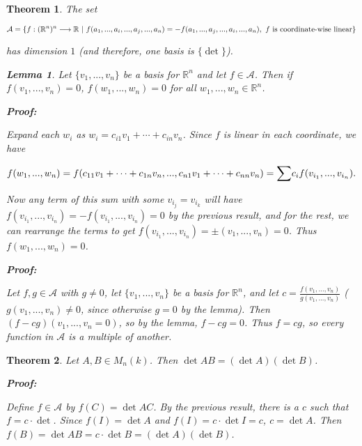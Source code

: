 \documentclass{article}
\theoremstyle{colontheorem}
\newtheorem{theorem}{Theorem}[section]
\newtheorem{lemma}{Lemma}[theorem]
\newenvironment{Theorem}
{
	\begin{mdframed}[backgroundcolor=TheoremOrange!10]
	\begin{theorem}
}
{
	\end{theorem}
	\end{mdframed}
	
	\vspace{.15in}
}
\newenvironment{Lemma}
{
	\begin{mdframed}[backgroundcolor=LemmaYellow!10]
	\begin{lemma}
}
{
	\end{lemma}
	\end{mdframed}
	
	\vspace{.03in}
}
\newenvironment{Proof}
{
	\begin{mdframed}[backgroundcolor=ProofPurple!10]
	\textbf{Proof:}%
}
{
	\end{mdframed}
	
	\vspace{.085in}
}
\begin{document}
\begin{Theorem}
	
	The set
	
	$$\mathcal{A} = \{f : (\mathbb{R}^n)^n \longrightarrow \mathbb{R}\ |\ f(a_1, ..., a_i, ..., a_j, ..., a_n) = -f(a_1, ..., a_j, ..., a_i, ..., a_n),\ f \textnormal{ is coordinate-wise linear} \}$$
	
	has dimension $1$ (and therefore, one basis is $\{\det\}$).
	
	\begin{Lemma}
		
		Let $\{v_1, ..., v_n\}$ be a basis for $\mathbb{R}^n$ and let $f \in \mathcal{A}$. Then if $f(v_1, ..., v_n) = 0$, $f(w_1, ..., w_n) = 0$ for all $w_1, ...,w_n \in \mathbb{R}^n$.
		
		\begin{Proof}
			Expand each $w_i$ as $w_i = c_{i1} v_1 + \cdots + c_{in} v_n$. Since $f$ is linear in each coordinate, we have
			
			$$f(w_1, ..., w_n) = f(c_{11} v_1 + \cdots + c_{1n} v_n, ..., c_{n1} v_1 + \cdots + c_{nn} v_n) = \scaleto{\sum}{4ex} c_i f(v_{i_1}, ..., v_{i_n}).$$
			
			Now any term of this sum with some $v_{i_j} = v_{i_k}$ will have $f(v_{i_1}, ..., v_{i_n}) = -f(v_{i_1}, ..., v_{i_n}) = 0$ by the previous result, and for the rest, we can rearrange the terms to get $f(v_{i_1}, ..., v_{i_n}) = \pm (v_1, ..., v_n) = 0$. Thus $f(w_1, ..., w_n) = 0$.
			
		\end{Proof}
		
	\end{Lemma}
	
	\begin{Proof}
		Let $f, g \in \mathcal{A}$ with $g \neq 0$, let $\{v_1, ..., v_n\}$ be a basis for $\mathbb{R}^n$, and let $c = \frac{f(v_1, ..., v_n)}{g(v_1, ..., v_n)}$ ($g(v_1, ..., v_n) \neq 0$, since otherwise $g = 0$ by the lemma). Then $(f - cg)(v_1, ..., v_n = 0)$, so by the lemma, $f - cg = 0$. Thus $f = cg$, so every function in $\mathcal{A}$ is a multiple of another.
		
	\end{Proof}
	
\end{Theorem}



\begin{Theorem}
	
	Let $A, B \in M_{n}(k)$. Then $\det AB = (\det A)(\det B)$.
	
	\begin{Proof}
		Define $f \in \mathcal{A}$ by $f(C) = \det AC$. By the previous result, there is a $c$ such that $f = c \cdot \det$. Since $f(I) = \det A$ and $f(I) = c \cdot \det I = c$, $c = \det A$. Then $f(B) = \det AB = c \cdot \det B = (\det A)(\det B)$.
		
	\end{Proof}
	
\end{Theorem}
\end{document}
